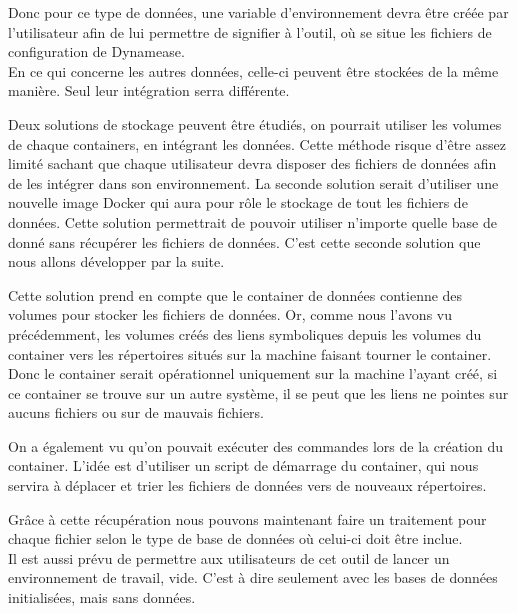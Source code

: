 Donc pour ce type de données, une variable d'environnement devra être créée par l'utilisateur afin de lui permettre de signifier à l'outil, où se situe les fichiers de configuration de Dynamease.\\

En ce qui concerne les autres données, celle-ci peuvent être stockées de la même manière. Seul leur intégration serra différente.

Deux solutions de stockage peuvent être étudiés, on pourrait utiliser les volumes de chaque containers, en intégrant les données. Cette méthode risque d'être assez limité sachant que chaque utilisateur devra disposer des fichiers de données afin de les intégrer dans son environnement. La seconde solution serait d'utiliser une nouvelle image Docker qui aura pour rôle le stockage de tout les fichiers de données. Cette solution permettrait de pouvoir utiliser n'importe quelle base de donné sans récupérer les fichiers de données. C'est cette seconde solution que nous allons développer par la suite.

Cette solution prend en compte que le container de données contienne des volumes pour stocker les fichiers de données. Or, comme nous l'avons vu précédemment, les volumes créés des liens symboliques depuis les volumes du container vers les répertoires situés sur la machine faisant tourner le container. Donc le container serait opérationnel uniquement sur la machine l'ayant créé, si ce container se trouve sur un autre système, il se peut que les liens ne pointes sur aucuns fichiers ou sur de mauvais fichiers. 

On a également vu qu'on pouvait exécuter des commandes lors de la création du container. L'idée est d'utiliser un script de démarrage du container, qui nous servira à déplacer et trier les fichiers de données vers de nouveaux répertoires.

Grâce à cette récupération nous pouvons maintenant faire un traitement pour chaque fichier selon le type de base de données où celui-ci doit être inclue.\\

Il est aussi prévu de permettre aux utilisateurs de cet outil de lancer un environnement de travail, vide. C'est à dire seulement avec les bases de données initialisées, mais sans données.